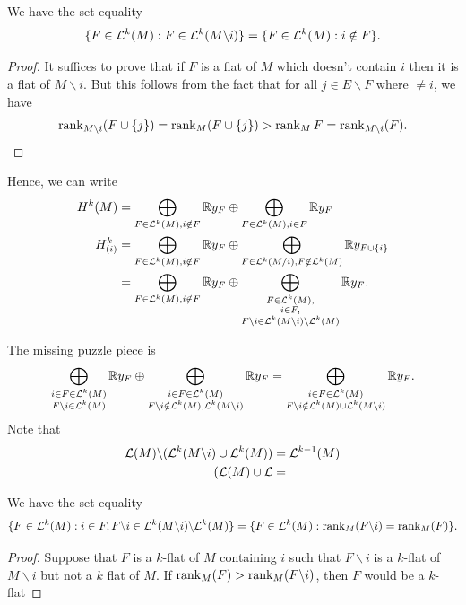 \documentclass{puthesis-UG}
\begin{document}
\begin{lem}
	We have the set equality
	\[
		\{F \in \mathcal{L}^k(M) : F \in \mathcal{L}^k(M \backslash i)\} = \{F \in \mathcal{L}^k(M) : i \notin F\}.
	\]
\end{lem}

\begin{proof}
	It suffices to prove that if $F$ is a flat of $M$ which doesn't contain $i$ then it is a flat of $M \backslash i$. But this follows from the fact that for all $j \in E \backslash F$ where $ \neq i$, we have
	\[
		\operatorname{rank}_{M \backslash i} (F \cup \{j\}) = \operatorname{rank}_M (F \cup \{j\}) > \operatorname{rank}_M F = \operatorname{rank}_{M \backslash i} (F). 
	\]
\end{proof}
Hence, we can write 
\begin{align*}
	H^k(M) & = \bigoplus_{F \in \mathcal{L}^k(M), i \notin F} \mathbb{R} y_F \oplus \bigoplus_{F \in \mathcal{L}^k(M), i \in F} \mathbb{R} y_F \\
	H^k_{(i)} & = \bigoplus_{F \in \mathcal{L}^k(M), i \notin F} \mathbb{R} y_F \oplus \bigoplus_{F \in \mathcal{L}^k(M / i), F \notin \mathcal{L}^k(M)} \mathbb{R} y_{F \cup \{i\}} \\
	& = \bigoplus_{F \in \mathcal{L}^k(M), i \notin F} \mathbb{R} y_F \oplus \bigoplus_{\substack{F \in \mathcal{L}^k(M), \\ i \in F, \\ F \backslash i \in \mathcal{L}^k(M \backslash i) \backslash \mathcal{L}^k(M)}} \mathbb{R} y_{F}.
\end{align*}

The missing puzzle piece is 
\[
	\bigoplus_{\substack{i \in F \in \mathcal{L}^k(M) \\ F \backslash i \in \mathcal{L}^k(M)}} \mathbb{R} y_F \oplus \bigoplus_{\substack{i \in F \in \mathcal{L}^k(M) \\ F\backslash i \notin \mathcal{L}^k(M), \mathcal{L}^k(M \backslash i)}} \mathbb{R} y_F = \bigoplus_{\substack{i \in F \in \mathcal{L}^k(M) \\ F\backslash i \notin \mathcal{L}^k(M) \cup \mathcal{L}^k(M \backslash i)}} \mathbb{R} y_F.
\]
Note that
\begin{align*}
	\mathcal{L}(M) \backslash (\mathcal{L}^k(M \backslash i) \cup \mathcal{L}^k(M)) & = \mathcal{L}^{k-1}(M) \\
	(\mathcal{L}(M) \cup \mathcal{L} & = 
\end{align*}
\begin{lem}
	We have the set equality
	\[
		\{F \in \mathcal{L}^k(M) : i \in F, F \backslash i \in \mathcal{L}^k (M \backslash i) \backslash \mathcal{L}^k(M)\} = \{F \in \mathcal{L}^k(M) : \operatorname{rank}_M(F \backslash i) = \operatorname{rank}_M(F)\}.
	\]
\end{lem}

\begin{proof}
	Suppose that $F$ is a $k$-flat of $M$ containing $i$ such that $F \backslash i$ is a $k$-flat of $M \backslash i$ but not a $k$ flat of $M$. If $\operatorname{rank}_M(F) > \operatorname{rank}_M(F \backslash i)$, then $F$ would be a $k$-flat
\end{proof}
\end{document}
